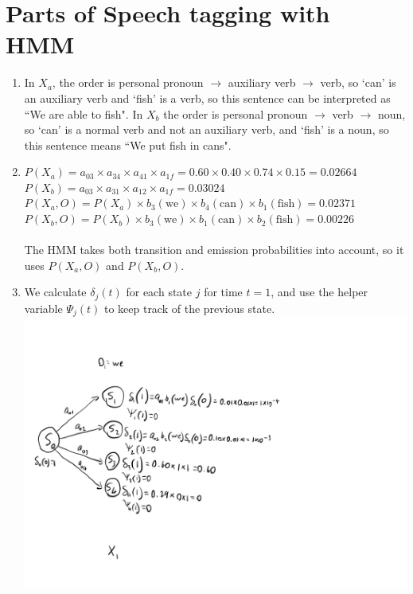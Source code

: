 \documentclass[12pt]{article}
\begin{document}
\section*{Parts of Speech tagging with HMM}
\begin{enumerate}
    \item In $X_a$, the order is personal pronoun $\rightarrow$ auxiliary verb $\rightarrow$ verb, so `can' is an auxiliary verb and `fish' is a verb, so this sentence can be interpreted as ``We are able to fish".
    In $X_b$ the order is personal pronoun $\rightarrow$ verb $\rightarrow$ noun, so `can' is a normal verb and not an auxiliary verb, and `fish' is a noun, so this sentence means ``We put fish in cans".
    \item $P(X_a) = a_{03} \times a_{34} \times a_{41} \times a_{1f} = 0.60 \times 0.40 \times 0.74 \times 0.15 = 0.02664$\\
    $P(X_b) = a_{03} \times a_{31} \times a_{12} \times a_{1f} = 0.03024$\\
    $P(X_a, O) = P(X_a) \times b_3(\text{we}) \times b_4(\text{can}) \times b_1(\text{fish}) = 0.02371$\\
    $P(X_b, O) = P(X_b) \times b_3(\text{we}) \times b_1(\text{can}) \times b_2(\text{fish}) = 0.00226$\\
    \\
    The HMM takes both transition and emission probabilities into account, so it uses $P(X_a, O)$ and $P(X_b, O)$.
    \item We calculate $\delta_j(t)$ for each state $j$ for time $t = 1$, and use the helper variable $\Psi_j(t)$ to keep track of the previous state.\\
    \includegraphics[scale=0.125]{3-1.jpg}\\

\end{enumerate}
\end{document}
